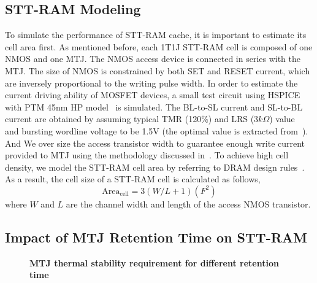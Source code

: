\subsection{STT-RAM Modeling}
To simulate the performance of STT-RAM cache, it is important to estimate its cell area first. As mentioned before, each 1T1J STT-RAM cell is composed of one NMOS and one MTJ. The NMOS access device is connected in series with the MTJ. The size of NMOS is constrained by both SET and RESET current, which are inversely proportional to the writing pulse width. In order to estimate the current driving ability of MOSFET devices, a small test circuit using HSPICE with PTM 45nm HP model~\cite{PTM} is simulated. The BL-to-SL current and SL-to-BL current are obtained by assuming typical TMR (120\%) and LRS ($3k\Omega$) value~\cite{STTRAM:Qualcomm09} and bursting wordline voltage to be 1.5V (the optimal value is extracted from~\cite{STTRAM:Gatech10}). And We over size the access transistor width to guarantee enough write current provided to MTJ using the methodology discussed in~\cite{STTRAM:RPI10}. To achieve high cell density, we model the STT-RAM cell area by referring to DRAM design rules~\cite{DRAM:6F2}.  As a result, the cell size of a STT-RAM cell is calculated as follows,
\begin{equation}
\mathrm{Area}_{\mathrm{cell}}={3\left(W/L+1\right)}(F^2)
\end{equation}
where $W$ and $L$ are the channel width and length of the access NMOS transistor.

\subsection{Impact of MTJ Retention Time on STT-RAM} \label{subsec:retention}
\begin{wrapfigure}{l}{0.50\textwidth}
\centering
  \caption{\label{fig:retention} \scriptsize \bf MTJ thermal stability requirement for different retention time}
\end{wrapfigure}

